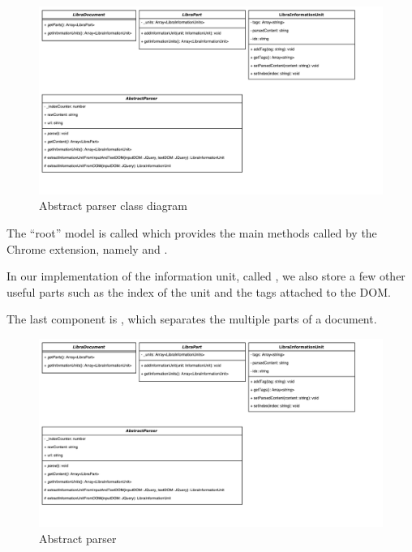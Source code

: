 \begin{figure}[H]
\centering
\includegraphics[scale=0.5]{Figures/ClassUML}
\caption{Abstract parser class diagram}
\label{fig:abstractParserClassDiagram}
\end{figure}

The ``root'' model is called  which provides the main methods called by the Chrome extension, namely  and . 

In our implementation of the information unit, called , we also store a few other useful parts such as the index of the unit and the tags attached to the DOM. 

The last component is , which separates the multiple parts of a document.



\begin{figure}[H]
\centering
\includegraphics[scale=0.5]{Figures/AbstractParserUML}
\caption{Abstract parser}
\label{fig:abstractParserDiagram}
\end{figure}


